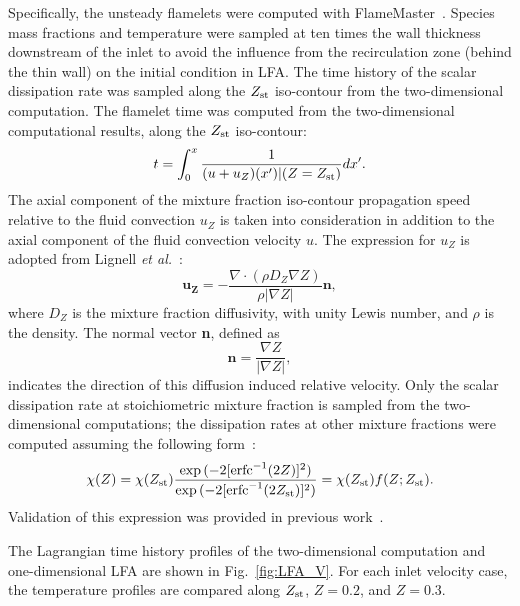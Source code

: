 \documentclass[review,3p,times]{elsarticle}
\begin{document}
Specifically, the unsteady flamelets were computed with FlameMaster~\cite{flamemaster}.  Species mass fractions and temperature were sampled at ten times the wall thickness downstream of the inlet to avoid the influence from the recirculation zone (behind the thin wall) on the initial condition in LFA.  The time history of the scalar dissipation rate was sampled along the $Z_{\rm st}$ iso-contour from the two-dimensional computation.  The flamelet time was computed from the two-dimensional computational results, along the $Z_{\rm st}$ iso-contour: 
 \begin{equation} \label{eq:t}
t = \int ^{x}_{0} \frac{1}{(u + u_Z)(x')|(Z=Z_{\rm st})} dx'.
\end{equation} 
The axial component of the mixture fraction iso-contour propagation speed relative to the fluid convection $u_Z$ is taken into consideration in addition to the axial component of the fluid convection velocity $u$.  The expression for $u_Z$ is adopted from Lignell \emph {et al.}~\cite{lignell07}:
\begin{equation}
\mathbf{u_Z} = -\frac{\nabla \cdot (\rho D_Z \nabla Z) }{\rho |\nabla Z|} \mathbf{n},
\end{equation}
where $D_Z$ is the mixture fraction diffusivity, with unity Lewis number, and $\rho$ is the density.  The normal vector \textbf{n}, defined as
\begin{equation}
\mathbf{n} = \frac{\nabla Z}{|\nabla Z|},
\end{equation}
indicates the direction of this diffusion induced relative velocity.  Only the scalar dissipation rate at stoichiometric mixture fraction is sampled from the two-dimensional computations; the dissipation rates at other mixture fractions were computed assuming the following form~\cite{petersbook}:
\begin{equation} \label{eq:Zref}
\chi{(Z)} = \chi{(Z_{\rm st})} \frac{\exp{(-2[{\rm erfc}^{-1}(2Z)]^2)}}{\exp{(-2[{\rm erfc}^{-1}(2Z_{\rm st})]^2)}} = \chi{(Z_{\rm st})} f(Z;Z_{\rm st}).
\end{equation}
Validation of this expression was provided in previous work~\cite{deng15}.

The Lagrangian time history profiles of the two-dimensional computation and one-dimensional LFA are shown in Fig.~\ref{fig:LFA_V}.  For each inlet velocity case, the temperature profiles are compared along $Z_{\rm st}$, $Z = 0.2$, and $Z = 0.3$.
\end{document}
